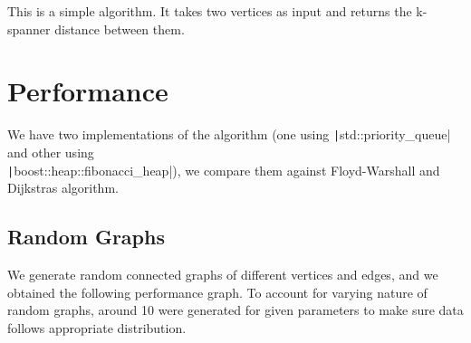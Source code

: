 \documentclass[12pt, a4paper]{article}
\newcommand{\code}[1]{\texttt|#1|}
\begin{document}
    This is a simple algorithm. It takes two vertices as input and returns the k-spanner distance between them.

    \section{Performance}

    We have two implementations of the algorithm (one using \code{std::priority_queue} and other using \\
    \code{boost::heap::fibonacci_heap}), we compare them against Floyd-Warshall and Dijkstras algorithm.

    \subsection{Random Graphs}

    We generate random connected graphs of different vertices and edges, and we obtained the following performance graph.
    To account for varying nature of random graphs, around 10 were generated for given parameters to make sure data follows appropriate distribution.
\\
    
\end{document}
